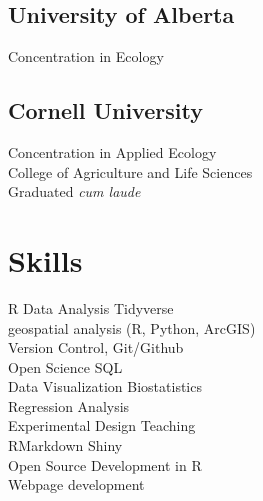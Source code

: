 \documentclass[]{deedy-resume-openfont}
\begin{document}
\begin{minipage}[t]{0.32\textwidth}
\subsection{University of Alberta}
Concentration in Ecology \\
\sectionsep

\subsection{Cornell University}
Concentration in Applied Ecology \\
College of Agriculture and Life Sciences \\
Graduated \textit{cum laude}
\sectionsep




\section{Skills}

\textbullet{} R \textbullet{} Data Analysis \textbullet{} Tidyverse \\\textbullet{} geospatial analysis (R, Python, ArcGIS) \\\textbullet{} Version Control, Git/Github \\\textbullet{} Open Science \textbullet{} SQL \\\textbullet{} Data Visualization \textbullet{} Biostatistics \\\textbullet{} Regression Analysis \\\textbullet{} Experimental Design \textbullet{} Teaching \\\textbullet{} RMarkdown \textbullet{} Shiny \\\textbullet{} Open Source Development in R \\ \textbullet{} Webpage development
\sectionsep


\end{minipage}
\end{document}
